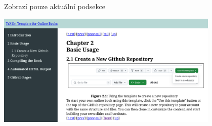 \begin{frame}[fragile]{Zobrazí pouze aktuální podsekce}

\includegraphics[width=0.8\textwidth]{img/collapsetoc.png}

\end{frame}


